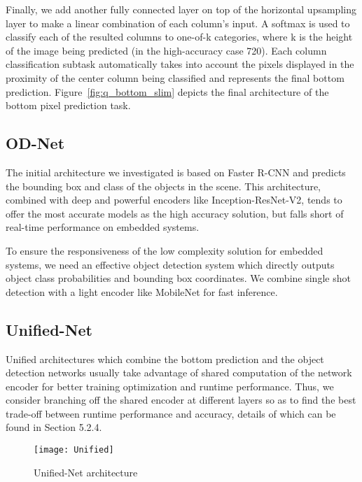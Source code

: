 \documentclass[10pt,twocolumn,letterpaper]{article}
\begin{document}
Finally, we add another fully connected layer on top of the horizontal upsampling layer to make a linear combination of each column's input. A softmax is used to classify each of the resulted columns to one-of-k categories, where k is the height of the image being predicted (in the high-accuracy case 720). Each column classification subtask automatically takes into account the pixels displayed in the proximity of the center column being classified and represents the final bottom prediction. Figure~\ref{fig:q_bottom_slim} depicts the final architecture of the bottom pixel prediction task.

\subsection{OD-Net}

The initial architecture we investigated is based on Faster R-CNN and predicts the bounding box and class of the objects in the scene. This architecture, combined with deep and powerful encoders like Inception-ResNet-V2, tends to offer the most accurate models as the high accuracy solution, but falls short of real-time performance on embedded systems.

To ensure the responsiveness of the low complexity solution for embedded systems, we need an effective object detection system which directly outputs object class probabilities and bounding box coordinates. We combine single shot detection with a light encoder like MobileNet for fast inference.

\subsection{Unified-Net} 

Unified architectures which combine the bottom prediction and the object detection networks usually take advantage of shared computation of the network encoder for better training optimization and runtime performance. Thus, we consider branching off the shared encoder at different layers so as to find the best trade-off between runtime performance and accuracy, details of which can be found in Section 5.2.4.

\begin{figure}[t]
\begin{center}
\texttt{[image: Unified]}
\end{center}
   \caption{Unified-Net architecture}
\label{fig:unified}
\end{figure}
\end{document}
